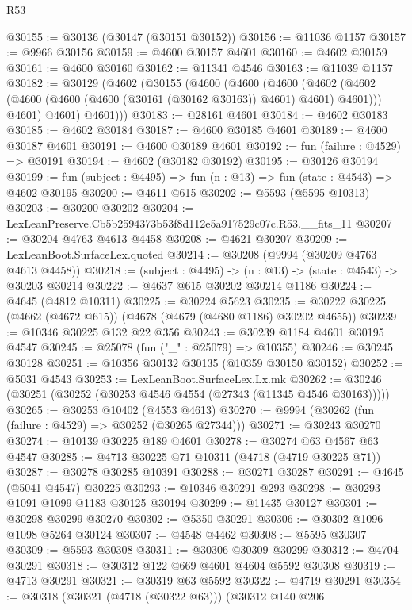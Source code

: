 \begin{lexlean}{R53}
\begin{coremodule}
@30155 := @30136 (@30147 (@30151 @30152))
@30156 := @11036 @1157
@30157 := @9966 @30156
@30159 := @4600 @30157 @4601
@30160 := @4602 @30159
@30161 := @4600 @30160
@30162 := @11341 @4546
@30163 := @11039 @1157
@30182 := @30129
    (@4602
      (@30155
        (@4600
          (@4600
            (@4600
              (@4602 (@4602 (@4600 (@4600 (@4600 (@30161 (@30162 @30163)) @4601) @4601) @4601)))
              @4601)
            @4601)
          @4601)))
@30183 := @28161 @4601
@30184 := @4602 @30183
@30185 := @4602 @30184
@30187 := @4600 @30185 @4601
@30189 := @4600 @30187 @4601
@30191 := @4600 @30189 @4601
@30192 := fun (failure : @4529) => @30191
@30194 := @4602 (@30182 @30192)
@30195 := @30126 @30194
@30199 := fun (subject : @4495) => fun (n : @13) => fun (state : @4543) => @4602 @30195
@30200 := @4611 @615
@30202 := @5593 (@5595 @10313)
@30203 := @30200 @30202
@30204 := LexLeanPreserve.Cb5b2594373b53f8d112e5a917529c07c.R53.__fits_11
@30207 := @30204 @4763 @4613 @4458
@30208 := @4621 @30207
@30209 := LexLeanBoot.SurfaceLex.quoted
@30214 := @30208 (@9994 (@30209 @4763 @4613 @4458))
@30218 := (subject : @4495) -> (n : @13) -> (state : @4543) -> @30203 @30214
@30222 := @4637 @615 @30202 @30214 @1186
@30224 := @4645 (@4812 @10311)
@30225 := @30224 @5623
@30235 := @30222 @30225 (@4662 (@4672 @615)) (@4678 (@4679 (@4680 @1186) @30202 @4655))
@30239 := @10346 @30225 @132 @22 @356
@30243 := @30239 @1184 @4601 @30195 @4547
@30245 := @25078 (fun ("_" : @25079) => @10355)
@30246 := @30245 @30128
@30251 := @10356 @30132 @30135 (@10359 @30150 @30152)
@30252 := @5031 @4543
@30253 := LexLeanBoot.SurfaceLex.Lx.mk
@30262 := @30246 (@30251 (@30252 (@30253 @4546 @4554 (@27343 (@11345 @4546 @30163)))))
@30265 := @30253 @10402 (@4553 @4613)
@30270 := @9994 (@30262 (fun (failure : @4529) => @30252 (@30265 @27344)))
@30271 := @30243 @30270
@30274 := @10139 @30225 @189 @4601
@30278 := @30274 @63 @4567 @63 @4547
@30285 := @4713 @30225 @71 @10311 (@4718 (@4719 @30225 @71))
@30287 := @30278 @30285 @10391
@30288 := @30271 @30287
@30291 := @4645 (@5041 @4547) @30225
@30293 := @10346 @30291 @293
@30298 := @30293 @1091 @1099 @1183 @30125 @30194
@30299 := @11435 @30127
@30301 := @30298 @30299 @30270
@30302 := @5350 @30291
@30306 := @30302 @1096 @1098 @5264 @30124
@30307 := @4548 @4462
@30308 := @5595 @30307
@30309 := @5593 @30308
@30311 := @30306 @30309 @30299
@30312 := @4704 @30291
@30318 := @30312 @122 @669 @4601 @4604 @5592 @30308
@30319 := @4713 @30291
@30321 := @30319 @63 @5592
@30322 := @4719 @30291
@30354 := @30318
    (@30321 (@4718 (@30322 @63)))
    (@30312
      @140
      @206

\end{coremodule}
\end{lexlean}
